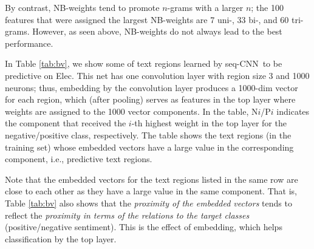 \documentclass[11pt,letterpaper]{article}
\newcommand{\scnn}{seq-CNN}
\newcommand{\Elec}{Elec}
\newcommand{\nbw}{NB-LM}
\begin{document}
By contrast, 
NB-weights tend to promote $n$-grams with a larger $n$; the 100 features that were assigned 
the largest NB-weights are 7 uni-, 33 bi-, and 60 tri-grams.  
However, as seen above, NB-weights do not always lead to the best performance.  

In Table \ref{tab:bv}, 
we show some of text regions learned by \scnn\ to be predictive on \Elec.  
This net has one convolution layer with region size 3 and 1000 neurons; 
thus, embedding by the convolution layer produces a 1000-dim vector 
for each region, which (after pooling) serves as features in the top layer
where weights are assigned to the 1000 vector components.  
In the table, N$i$/P$i$ indicates the component that received 
the $i$-th highest weight in the top layer 
for the negative/positive class, respectively. The table shows the text regions 
(in the training set) whose embedded vectors have a large value
in the corresponding component, i.e., predictive text regions.  

Note that the embedded vectors for the text regions listed in the same row 
are close to each other as they have a large value in the same component. 
That is, Table \ref{tab:bv} also shows that
the {\em proximity of the embedded vectors} tends to reflect the {\em proximity  
in terms of the relations to the target classes} (positive/negative sentiment). 
This is the effect of embedding, which helps classification by the top layer.  

\end{document}
